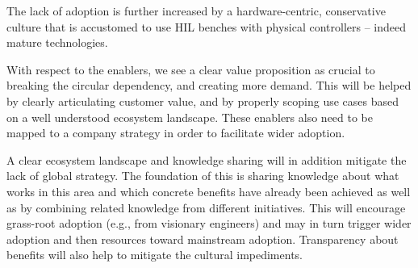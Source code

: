 The lack of adoption is further increased by a hardware-centric, conservative culture that is accustomed to use HIL benches with physical controllers -- indeed mature technologies.

With respect to the enablers, we see a clear value proposition as crucial to breaking the circular dependency, and creating more demand.
This will be helped by clearly articulating customer value, and by properly scoping use cases based on a well understood ecosystem landscape.
These enablers also need to be mapped to a company strategy in order to facilitate wider adoption. 

A clear ecosystem landscape and knowledge sharing will in addition mitigate the lack of global strategy.
The foundation of this is sharing knowledge about what works in this area and which concrete benefits have already been achieved as well as by combining related knowledge from different initiatives.
This will encourage grass-root adoption (e.g., from visionary engineers) and may in turn trigger wider adoption and then resources toward mainstream adoption.
Transparency about benefits will also help to mitigate the cultural impediments.


